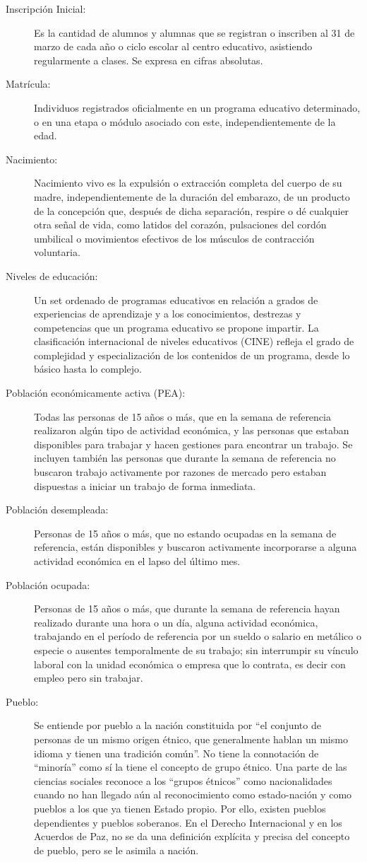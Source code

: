 \begin{description}
\item[Inscripción Inicial:  ] Es la cantidad de alumnos y alumnas que se registran o inscriben al 31 de marzo de cada año o ciclo escolar al centro educativo, asistiendo regularmente a clases. Se expresa en cifras absolutas.
\item[Matrícula: ] Individuos registrados oficialmente en un programa educativo determinado, o en una etapa o módulo asociado con este, independientemente de la edad.
\item[Nacimiento:  ] Nacimiento vivo es la expulsión o extracción completa del cuerpo de su madre, independientemente de la duración del embarazo, de un producto de la concepción que, después de dicha separación, respire o dé cualquier otra señal de vida, como latidos del corazón, pulsaciones del cordón umbilical o movimientos efectivos de los músculos de contracción voluntaria. 
\item[Niveles de educación:  ] Un set ordenado de programas educativos en relación a grados de experiencias de aprendizaje y a los conocimientos, destrezas y competencias que un programa educativo se propone impartir. La clasificación internacional de niveles educativos (CINE) refleja el grado de complejidad y especialización de los contenidos de un programa, desde lo básico hasta lo complejo.
\item[Población económicamente activa (PEA):  ] Todas las personas de 15 años o más, que en la semana de referencia realizaron algún tipo de actividad económica, y las personas que estaban disponibles para trabajar y hacen gestiones para encontrar un trabajo. Se incluyen también las personas que durante la semana de referencia no buscaron trabajo activamente por razones de mercado pero estaban dispuestas a iniciar un trabajo de forma inmediata. 
\item[Población desempleada:  ] Personas de 15 años o más, que no estando ocupadas en la semana de referencia, están disponibles y buscaron activamente incorporarse a alguna actividad económica en el lapso del último mes.
\item[Población ocupada:  ] Personas de 15 años o más, que durante la semana de referencia hayan realizado durante una hora o un día, alguna actividad económica, trabajando en el período de referencia por un sueldo o salario en metálico o especie o ausentes temporalmente de su trabajo; sin interrumpir su vínculo laboral con la unidad económica o empresa que lo contrata, es decir con empleo pero sin trabajar. 
\item[Pueblo:  ] Se entiende por pueblo a la nación constituida por “el conjunto de personas de un mismo origen étnico, que generalmente hablan un mismo idioma y tienen una tradición común”. No tiene la connotación de “minoría” como sí la tiene el concepto de grupo étnico. Una parte de las ciencias sociales reconoce a los “grupos étnicos” como nacionalidades cuando no han llegado aún al reconocimiento como estado-nación y como pueblos a los que ya tienen Estado propio. Por ello, existen pueblos dependientes y pueblos soberanos. En el Derecho Internacional y en los Acuerdos de Paz, no se da una definición explícita y precisa del concepto de pueblo, pero se le asimila a nación.

\end{description}
